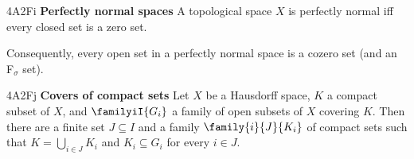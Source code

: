 \spheader 4A2Fi {\bf Perfectly normal spaces} A topological space $X$ is
perfectly normal iff every closed set is a zero set.

Consequently, every open set in a perfectly normal space is a cozero set
(and an F$_{\sigma}$ set).

\spheader 4A2Fj {\bf Covers of compact sets} Let $X$ be a Hausdorff space,
$K$ a compact subset of $X$, and $\familyiI{G_i}$ a family of open subsets
of $X$ covering $K$.   Then there are a finite set $J\subseteq I$ and a
family $\family{i}{J}{K_i}$ of compact sets such that
$K=\bigcup_{i\in J}K_i$ and $K_i\subseteq G_i$ for every $i\in J$.

